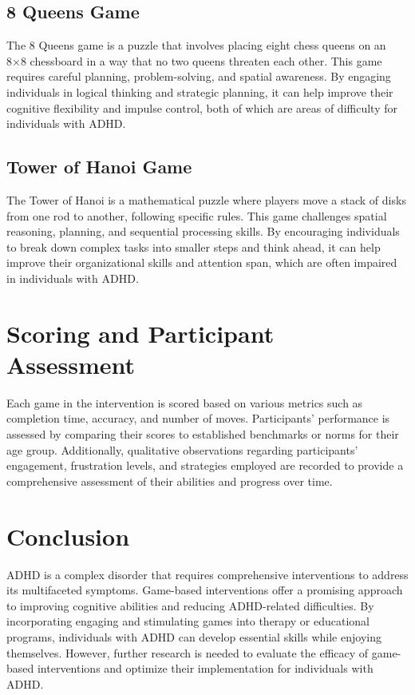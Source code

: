 \documentclass{article}
\begin{document}
\subsection{8 Queens Game}
The 8 Queens game is a puzzle that involves placing eight chess queens on an 8×8 chessboard in a way that no two queens threaten each other. This game requires careful planning, problem-solving, and spatial awareness. By engaging individuals in logical thinking and strategic planning, it can help improve their cognitive flexibility and impulse control, both of which are areas of difficulty for individuals with ADHD.

\subsection{Tower of Hanoi Game}
The Tower of Hanoi is a mathematical puzzle where players move a stack of disks from one rod to another, following specific rules. This game challenges spatial reasoning, planning, and sequential processing skills. By encouraging individuals to break down complex tasks into smaller steps and think ahead, it can help improve their organizational skills and attention span, which are often impaired in individuals with ADHD.

\section{Scoring and Participant Assessment}
Each game in the intervention is scored based on various metrics such as completion time, accuracy, and number of moves. Participants' performance is assessed by comparing their scores to established benchmarks or norms for their age group. Additionally, qualitative observations regarding participants' engagement, frustration levels, and strategies employed are recorded to provide a comprehensive assessment of their abilities and progress over time.

\section{Conclusion}
ADHD is a complex disorder that requires comprehensive interventions to address its multifaceted symptoms. Game-based interventions offer a promising approach to improving cognitive abilities and reducing ADHD-related difficulties. By incorporating engaging and stimulating games into therapy or educational programs, individuals with ADHD can develop essential skills while enjoying themselves. However, further research is needed to evaluate the efficacy of game-based interventions and optimize their implementation for individuals with ADHD.
\end{document}
